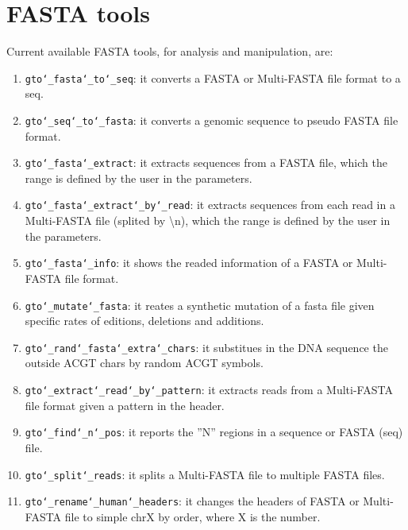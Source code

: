 \chapter{FASTA tools}
\label{fasta}

Current available FASTA tools, for analysis and manipulation, are:
\begin{enumerate}
\item \texttt{gto\char`_fasta\char`_to\char`_seq}: it converts a FASTA or Multi-FASTA file format to a seq.
\item \texttt{gto\char`_seq\char`_to\char`_fasta}: it converts a genomic sequence to pseudo FASTA file format.
\item \texttt{gto\char`_fasta\char`_extract}: it extracts sequences from a FASTA file, which the range is defined by the user in the parameters.
\item \texttt{gto\char`_fasta\char`_extract\char`_by\char`_read}: it extracts sequences from each read in a Multi-FASTA file (splited by \textbackslash n), which the range is defined by the user in the parameters.
\item \texttt{gto\char`_fasta\char`_info}: it shows the readed information of a FASTA or Multi-FASTA file format.
\item \texttt{gto\char`_mutate\char`_fasta}: it reates a synthetic mutation of a fasta file given specific rates of editions, deletions and additions.
\item \texttt{gto\char`_rand\char`_fasta\char`_extra\char`_chars}: it substitues in the DNA sequence the outside ACGT chars by random ACGT symbols.
\item \texttt{gto\char`_extract\char`_read\char`_by\char`_pattern}: it extracts reads from a Multi-FASTA file format given a pattern in the header.
\item \texttt{gto\char`_find\char`_n\char`_pos}: it reports the ''N'' regions in a sequence or FASTA (seq) file.
\item \texttt{gto\char`_split\char`_reads}: it splits a Multi-FASTA file to multiple FASTA files.
\item \texttt{gto\char`_rename\char`_human\char`_headers}: it changes the headers of FASTA or Multi-FASTA file to simple chrX by order, where X is the number.

\end{enumerate}





 





